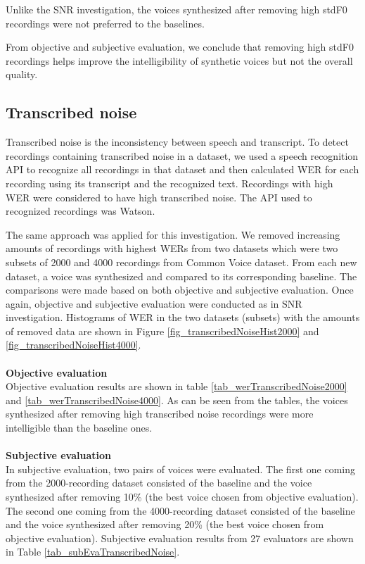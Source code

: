 \documentclass[12pt]{article}
\begin{document}
Unlike the SNR investigation, the voices synthesized after removing high stdF0 recordings were not preferred to the baselines.

From objective and subjective evaluation, we conclude that removing high stdF0 recordings helps improve the intelligibility of synthetic voices but not the overall quality.

\subsection{Transcribed noise}
Transcribed noise is the inconsistency between speech and transcript. To detect recordings containing transcribed noise in a dataset, we used a speech recognition API to recognize all recordings in that dataset and then calculated WER for each recording using its transcript and the recognized text. Recordings with high WER were considered to have high transcribed noise. The API used to recognized recordings was Watson.

The same approach was applied for this investigation. We removed increasing amounts of recordings with highest WERs from two datasets which were two subsets of 2000 and 4000 recordings from Common Voice dataset. From each new dataset, a voice was synthesized and compared to its corresponding baseline. The comparisons were made based on both objective and subjective evaluation. Once again, objective and subjective evaluation were conducted as in SNR investigation. Histograms of WER in the two datasets (subsets) with the amounts of removed data are shown in Figure \ref{fig_transcribedNoiseHist2000} and \ref{fig_transcribedNoiseHist4000}.\\\\
\textbf{Objective evaluation}
\vspace{0.28cm}\\
Objective evaluation results are shown in table \ref{tab_werTranscribedNoise2000} and \ref{tab_werTranscribedNoise4000}. As can be seen from the tables, the voices synthesized after removing high transcribed noise recordings were more intelligible than the baseline ones.\\\\
\textbf{Subjective evaluation}
\vspace{0.28cm}\\
In subjective evaluation, two pairs of voices were evaluated. The first one coming from the 2000-recording dataset consisted of the baseline and the voice synthesized after removing 10\% (the best voice chosen from objective evaluation). The second one coming from the 4000-recording dataset consisted of the baseline and the voice synthesized after removing 20\% (the best voice chosen from objective evaluation). Subjective evaluation results from 27 evaluators are shown in Table \ref{tab_subEvaTranscribedNoise}.
\end{document}
